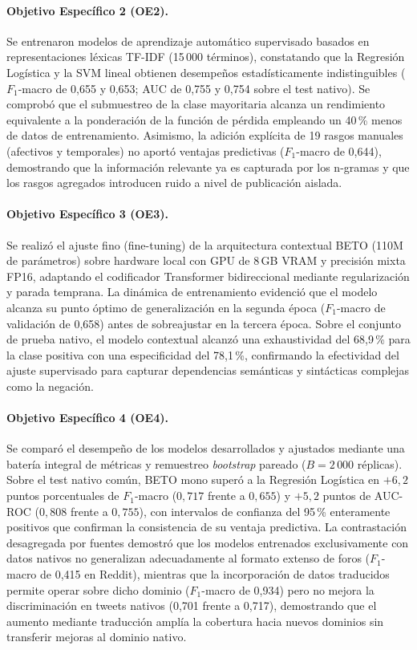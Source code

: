 \documentclass[12pt,a4paper]{article}
\begin{document}
\paragraph{Objetivo Específico 2 (OE2).}
Se entrenaron modelos de aprendizaje automático supervisado basados en representaciones léxicas TF-IDF (15\,000 términos), constatando que la Regresión Logística y la SVM lineal obtienen desempeños estadísticamente indistinguibles ($F_1$-macro de 0{,}655 y 0{,}653; AUC de 0{,}755 y 0{,}754 sobre el test nativo). Se comprobó que el submuestreo de la clase mayoritaria alcanza un rendimiento equivalente a la ponderación de la función de pérdida empleando un 40\,\% menos de datos de entrenamiento. Asimismo, la adición explícita de 19 rasgos manuales (afectivos y temporales) no aportó ventajas predictivas ($F_1$-macro de 0{,}644), demostrando que la información relevante ya es capturada por los n-gramas y que los rasgos agregados introducen ruido a nivel de publicación aislada.

\paragraph{Objetivo Específico 3 (OE3).}
Se realizó el ajuste fino (fine-tuning) de la arquitectura contextual BETO (110M de parámetros) sobre hardware local con GPU de 8\,GB VRAM y precisión mixta FP16, adaptando el codificador Transformer bidireccional mediante regularización y parada temprana. La dinámica de entrenamiento evidenció que el modelo alcanza su punto óptimo de generalización en la segunda época ($F_1$-macro de validación de 0{,}658) antes de sobreajustar en la tercera época. Sobre el conjunto de prueba nativo, el modelo contextual alcanzó una exhaustividad del 68{,}9\,\% para la clase positiva con una especificidad del 78{,}1\,\%, confirmando la efectividad del ajuste supervisado para capturar dependencias semánticas y sintácticas complejas como la negación.

\paragraph{Objetivo Específico 4 (OE4).}
Se comparó el desempeño de los modelos desarrollados y ajustados mediante una batería integral de métricas y remuestreo \emph{bootstrap} pareado ($B=2\,000$ réplicas). Sobre el test nativo común, BETO mono superó a la Regresión Logística en $+6{,}2$ puntos porcentuales de $F_1$-macro ($0{,}717$ frente a $0{,}655$) y $+5{,}2$ puntos de AUC-ROC ($0{,}808$ frente a $0{,}755$), con intervalos de confianza del 95\,\% enteramente positivos que confirman la consistencia de su ventaja predictiva. La contrastación desagregada por fuentes demostró que los modelos entrenados exclusivamente con datos nativos no generalizan adecuadamente al formato extenso de foros ($F_1$-macro de 0{,}415 en Reddit), mientras que la incorporación de datos traducidos permite operar sobre dicho dominio ($F_1$-macro de 0{,}934) pero no mejora la discriminación en tweets nativos (0{,}701 frente a 0{,}717), demostrando que el aumento mediante traducción amplía la cobertura hacia nuevos dominios sin transferir mejoras al dominio nativo.
\end{document}
